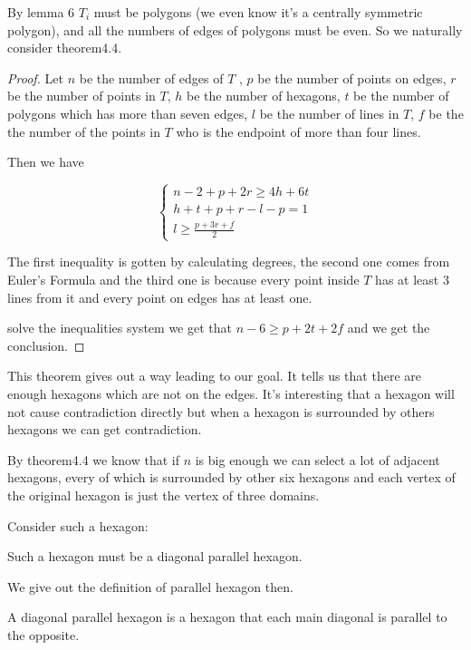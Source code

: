 \begin{rem}
	By lemma 6 $T_i$ must be polygons (we even know it's a centrally 
	symmetric polygon), and all the numbers of edges of polygons must
	be even. So we naturally consider theorem4.4. 
\end{rem}

\begin{proof}
	Let $n$ be the number of edges of $T$ , $p$ be the number of points
	on edges, $r$ be the number of points in $T$, $h$ be the number of 
	hexagons, $t$ be the number of polygons which has more than seven 
	edges, $l$ be the number of lines in $T$, $f$ be the the number of 
	the points in $T$ who is the endpoint of more than four lines.
	
	Then we have
	
	\[
	\begin{cases}
	n - 2 + p + 2r \geq 4h + 6t\\
	h + t + p + r - l - p = 1 \\
	l \geq \frac{p + 3r + f}{2}
	\end{cases}
	\]
	
	The first inequality is gotten by calculating degrees, 
	the second one comes from  Euler's Formula and the third one 
	is because every point inside $T$ has at least 3 lines from it 
	and every point on edges has at least one.
	
	solve the inequalities system we get that $n - 6 \geq p + 2t + 2f$ and
	we get the conclusion.
\end{proof}	

This theorem gives out a way leading to our goal. It tells us 
that there are enough hexagons which are not on the edges. It's 
interesting that a hexagon will not cause contradiction directly 
but when a hexagon is surrounded by others hexagons we can get 
contradiction.


By theorem4.4 we know that if $n$ is big enough we can select a 
lot of adjacent hexagons, every of which is surrounded by other 
six hexagons and each vertex of the original hexagon is just the
vertex of three domains.

Consider such a hexagon:

\begin{thm}
	Such a hexagon must be a diagonal parallel hexagon.
\end{thm}	 

We give out the definition of parallel hexagon then.

\begin{defn}
	A diagonal parallel hexagon is a hexagon that each main 
	diagonal is parallel to the opposite.
\end{defn}


